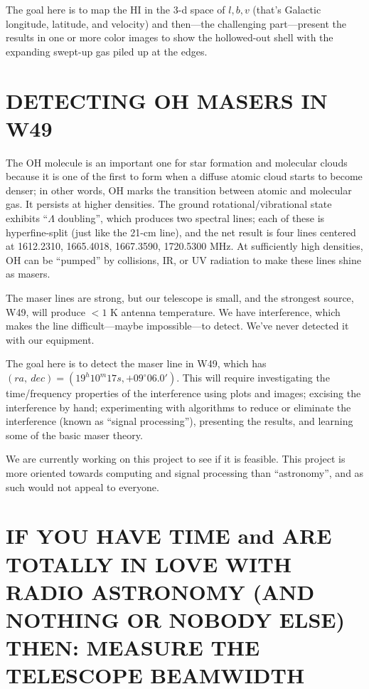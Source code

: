 \documentclass[preprint]{aastex}
\begin{document}
The goal here is to map the HI in the 3-d space of ${l, b, v}$ (that's
Galactic longitude, latitude, and velocity) and then---the challenging
part---present the results in one or more color images to show the
hollowed-out shell with the expanding swept-up gas piled up at the
edges.

\section{DETECTING OH MASERS IN W49}

The OH molecule is an important one for star formation and molecular
clouds because it is one of the first to form when a diffuse atomic
cloud starts to become denser; in other words, OH marks the transition
between atomic and molecular gas. It persists at higher densities. The
ground rotational/vibrational state exhibits ``$\Lambda$ doubling'',
which produces two spectral lines; each of these is hyperfine-split
(just like the 21-cm line), and the net result is four lines centered at
1612.2310, 1665.4018, 1667.3590, 1720.5300 MHz. At sufficiently high
densities, OH can be ``pumped'' by collisions, IR, or UV radiation to
make these lines shine as masers.

The maser lines are strong, but our telescope is small, and the
strongest source, W49, will produce $< 1$ K antenna temperature. We have
interference, which makes the line difficult---maybe impossible---to
detect. We've never detected it with our equipment. 

The goal here is to detect the maser line in W49, which has $(ra,\
 dec) = (19^h 10^m 17s, +09^\circ 06.0')$. This will require
 investigating the time/frequency properties of the interference using
 plots and images; excising the interference by hand; experimenting with 
algorithms to reduce or eliminate the interference (known as ``signal
 processing''), presenting the results, and learning some of the basic
 maser theory. 

We are currently working on this project to see if it is feasible. This
project is more oriented towards computing and signal processing than
``astronomy'', and as such would not appeal to everyone.

\section{ IF YOU HAVE TIME and ARE TOTALLY IN LOVE WITH RADIO ASTRONOMY
  (AND NOTHING OR NOBODY ELSE) THEN: MEASURE THE TELESCOPE BEAMWIDTH} 
\end{document}
